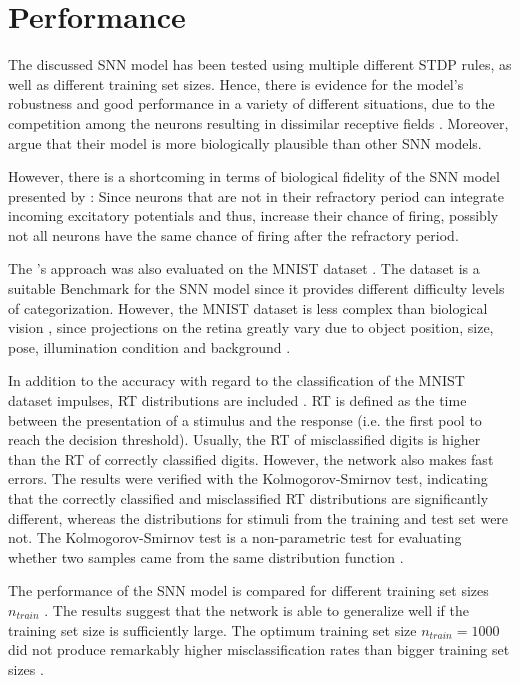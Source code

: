 \section{Performance}
\label{sec:result}

The discussed \ac{SNN} model has been tested using multiple different \ac{STDP} rules, as well as different training set sizes. 
Hence, there is evidence for the model's robustness and good performance in a variety of different situations, 
due to the competition among the neurons resulting in dissimilar receptive fields \cite{SNN}.
Moreover, \authorsSNN{} \cite{SNN} argue that their model is more biologically plausible than other \ac{SNN} models.

However, there is a shortcoming in terms of biological fidelity of the \ac{SNN} model presented by \authorsSNN{} \cite{SNN}:
Since neurons that are not in their refractory period can integrate incoming excitatory potentials and thus, 
increase their chance of firing, possibly not all neurons have the same chance of firing after the refractory period.

The \authorsSTDPlike{}'s approach was also evaluated on the MNIST dataset \cite{STDP_like}.
The dataset is a suitable Benchmark for the \ac{SNN} model 
since it provides different difficulty levels of categorization.
However, the MNIST dataset is less complex than biological vision \cite{STDP_like}, 
since projections on the retina greatly vary due to object position, size, pose, illumination condition and background \cite{multi_scale_STDP}.

In addition to the accuracy with regard to the classification of the MNIST dataset impulses, \ac{RT} distributions are included \cite{STDP_like}.
\ac{RT} is defined as the time between the presentation of a stimulus and the response (i.e. the first pool to reach the decision threshold).
Usually, the \ac{RT} of misclassified digits is higher than the \ac{RT} of correctly classified digits.
However, the network also makes fast errors.
The results were verified \cite{STDP_like} with the Kolmogorov-Smirnov test, 
indicating that the correctly classified and misclassified \ac{RT} distributions are significantly different, 
whereas the distributions for stimuli from the training and test set were not.
The Kolmogorov-Smirnov test is a non-parametric test for evaluating whether two samples came from the same distribution function \cite{Kolmogorov_Smirnov}.

The performance of the \ac{SNN} model is compared for different training set sizes $n_{train}$ \cite{STDP_like}.
The results suggest that the network is able to generalize well if the training set size is sufficiently large.
The optimum training set size $n_{train} = 1000$ did not produce remarkably higher misclassification rates than bigger training set sizes \cite{STDP_like}.


